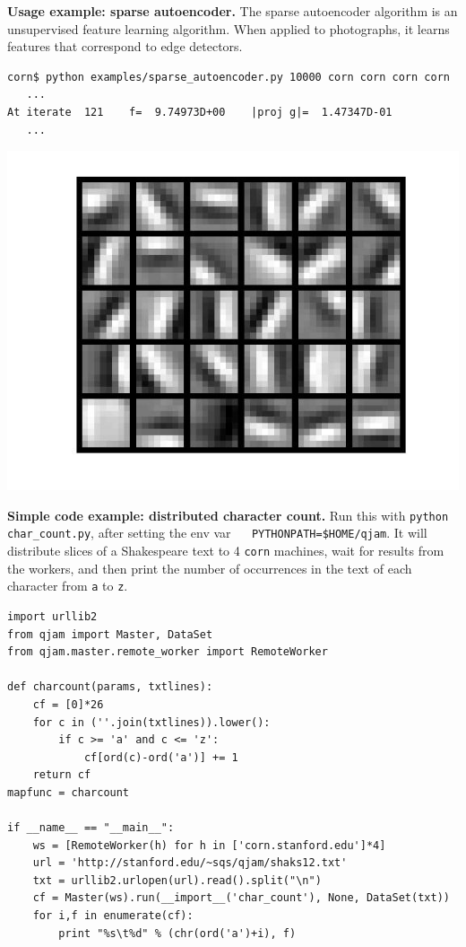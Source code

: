 \documentclass[10pt]{article}
\begin{document}
{\bf Usage example: sparse autoencoder.} The sparse autoencoder algorithm is an unsupervised feature learning
algorithm. When applied to photographs, it learns features that
correspond to edge detectors.

\begin{verbatim}
corn$ python examples/sparse_autoencoder.py 10000 corn corn corn corn
   ...
At iterate  121    f=  9.74973D+00    |proj g|=  1.47347D-01
   ...
\end{verbatim}

\includegraphics[scale=0.25]{sparseautoencoder_output.png}

{\bf Simple code example: distributed character count.} Run this with {\tt python char\_count.py}, after setting the env var $\quad$ {\tt PYTHONPATH=\$HOME/qjam}. It will distribute slices of a Shakespeare text to 4 {\tt corn} machines, wait for results from the workers, and then print the number of occurrences in the text of each character from {\tt a} to {\tt z}.

\begin{lstlisting}
import urllib2
from qjam import Master, DataSet
from qjam.master.remote_worker import RemoteWorker

def charcount(params, txtlines):
    cf = [0]*26
    for c in (''.join(txtlines)).lower():
        if c >= 'a' and c <= 'z':
            cf[ord(c)-ord('a')] += 1
    return cf
mapfunc = charcount

if __name__ == "__main__":
    ws = [RemoteWorker(h) for h in ['corn.stanford.edu']*4]
    url = 'http://stanford.edu/~sqs/qjam/shaks12.txt'
    txt = urllib2.urlopen(url).read().split("\n")
    cf = Master(ws).run(__import__('char_count'), None, DataSet(txt))
    for i,f in enumerate(cf):
        print "%s\t%d" % (chr(ord('a')+i), f)
\end{lstlisting}
\end{document}
